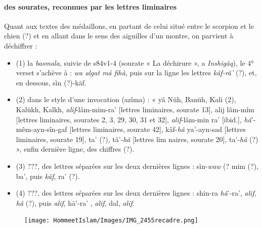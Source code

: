 \paragraph{des sourates, reconnues par les lettres liminaires}
Quant aux textes des médaillons, en partant de celui situé entre le scorpion et le chien (?) et en allant dans le sens des aiguilles d'un montre, on parvient à déchiffrer :
\begin{itemize}
    \item (1) la \textit{basmala}, suivie de s84v1-4 (sourate « La déchirure », a
\textit{Inshigãq}), le 4° verset s'achève à : \textit{wa algat má fihà}, puis sur la ligne
les lettres \textit{kâf-râ'} (?), et, en dessous, sìn (?)-käf.
\item (2) dans le style d'une invocation (azîma) : « yâ Nüh, Banüh, Kali
(2), Kalükh, Kalkh, \textit{alif}-lâm-mim-ra' [lettres liminaires, sourate 13], alij lâm-mîm [lettres liminaires, sourates 2, 3, 29, 30, 31 et 32], \textit{alif}-lâm-min
ra' [ibid.], \textit{hâ}'-mêm-ayn-sîn-gaf [lettres liminaires, sourate 42], kâf-\textit{hâ}
ya'-ayn-sad [lettres liminaires, sourate 19], ta' (?), tâ'-\textit{hâ} [lettres lim naires, sourate 20], ta'-\textit{hâ} (?) », enfin dernière ligne, des chiffres (?).
\item (3) ???, des lettres séparées sur les deux dernières lignes : sìn-\textit{waw} (?
mim (?), ba', puis \textit{kâf}, ra' (?).
\item (4) ???, des lettres séparées sur les deux dernières lignes : shin-ra
\textit{hâ}'-ra', \textit{alif}, \textit{hâ} (?), puis \textit{alif}, hā'-ra' , \textit{alif}, dal, \textit{alif}.
\end{itemize}

\begin{figure}[h!]
    \centering
  
    \texttt{[image: HommeetIslam/Images/IMG\_2455recadre.png]}
    \label{fig:my_label}
\end{figure}



